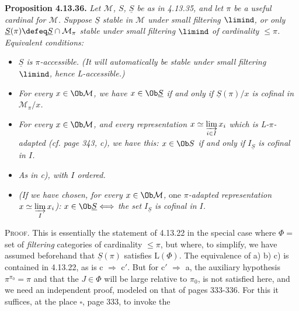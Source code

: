 \textbf{Proposition 4.13.36.} \textit{Let $\mathcal{M}$, $S$, $\underline{S}$ be as in 4.13.35, and let $\pi$ be a useful cardinal for $\mathcal{M}$. Suppose $\underline{S}$ stable in $\mathcal{M}$ under small filtering $\limind$, or only $\underline{S}(\pi) \defeq \underline{S} \cap \mathcal{M}_\pi$ stable under small filtering $\limind$ of cardinality $\leqslant \pi$. Equivalent conditions:}
\begin{itemize}[leftmargin=2.5em]
\item[\textit{a)}] \textit{$\underline{S}$ is $\pi$-accessible. (It will automatically be stable under small filtering $\limind$, hence L-accessible.)}
\item[\textit{b)}] \textit{For every $x \in \Ob \mathcal{M}$, we have $x \in \Ob \underline{S}$ if and only if $\underline{S}(\pi)/x$ is cofinal in $\mathcal{M}_\pi/x$.}
\item[\textit{c)}] \textit{For every $x \in \Ob \mathcal{M}$, and every representation $x \simeq \varinjlim\limits_{i\in I} x_i$}
\textit{which is L-$\pi$-adapted (cf. page 343, c), we have this: $x \in \Ob S$ if and only if $I_{\underline{S}}$ is cofinal in $I$.}
\item[\textit{c}$'$\textit{)}] \textit{As in c), with $I$ ordered.}
\item[\textit{c}$''$\textit{)}] \textit{(If we have chosen, for every $x \in \Ob \mathcal{M}$,} one \textit{$\pi$-adapted representation $x \simeq \varinjlim\limits_{I} x_i$): $x \in \Ob \underline{S} \Longleftrightarrow$ the set $I_{\underline{S}}$ is cofinal in $I$.}
\end{itemize}
\textsc{Proof}. This is essentially the statement of 4.13.22 in the special case where $\Phi =$ set of \textit{filtering} categories of cardinality $\leqslant \pi$, but where, to simplify, we have assumed beforehand that $\underline{S}(\pi)$ satisfies $\mathrm{L}(\Phi)$. The equivalence of a) b) c) is contained in 4.13.22, as is c $\Longrightarrow$ c$'$. But for c$'$ $\Longrightarrow$ a, the auxiliary hypothesis $\pi^{\pi_0} = \pi$ and that the $J \in \Phi$ will be large relative to $\pi_0$, is not satisfied here, and we need an independent proof, modeled on that of pages 333-336. For this it suffices, at the place $\square$, page 333, to invoke the %

